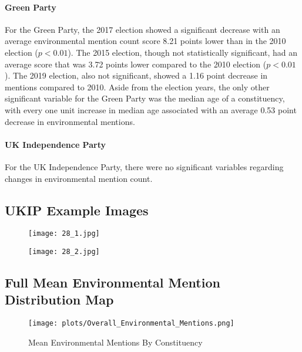 \documentclass[12pt,letterpaper]{article}
\begin{document}
\paragraph{Green Party}

For the Green Party, the 2017 election showed a significant decrease with an average environmental mention count score 8.21 points lower than in the 2010 election ($p<0.01$). The 2015 election, though not statistically significant, had an average score that was 3.72 points lower compared to the 2010 election ($p<0.01$). The 2019 election, also not significant, showed a 1.16 point decrease in mentions compared to 2010. Aside from the election years, the only other significant variable for the Green Party was the median age of a constituency, with every one unit increase in median age associated with an average 0.53 point decrease in environmental mentions.

\paragraph{UK Independence Party}

For the UK Independence Party, there were no significant variables regarding changes in environmental mention count.


\subsection{UKIP Example Images}


\begin{figure}[H]
	\centering
	\texttt{[image: 28\_1.jpg]}
	\caption{}
	\label{fig:28_1}
\end{figure}

\begin{figure}[H]
	\centering
	\texttt{[image: 28\_2.jpg]}
	\caption{}
	\label{fig:28_2}
\end{figure}





\subsection{Full Mean Environmental Mention Distribution Map}

\begin{figure}[H]
	\centering
	\texttt{[image: plots/Overall\_Environmental\_Mentions.png]}
	\caption{Mean Environmental Mentions By Constituency}
	\label{fig:meanenvbyconold}
\end{figure}







\newpage
	
\printbibliography
	
\end{document}
